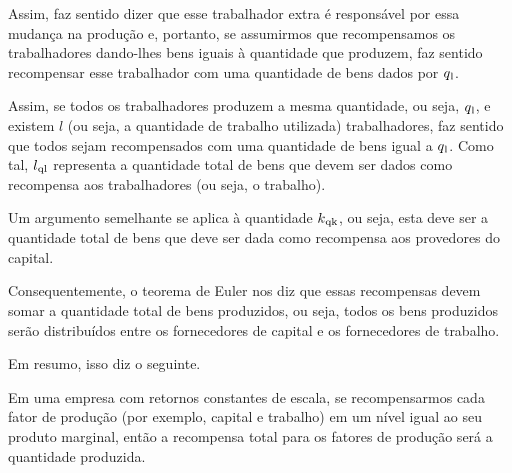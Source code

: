 \documentclass[a4paper]{article}
\begin{document}
\par Assim, faz sentido dizer que esse trabalhador extra é responsável por essa mudança na produção e, portanto, se assumirmos que recompensamos os trabalhadores dando-lhes bens iguais à quantidade que produzem, faz sentido recompensar esse trabalhador com uma quantidade de bens dados por $q\textsubscript{l}$.

\par Assim, se todos os trabalhadores produzem a mesma quantidade, ou seja, $q\textsubscript{l}$, e existem $l$ (ou seja, a quantidade de trabalho utilizada) trabalhadores, faz sentido que todos sejam recompensados com uma quantidade de bens igual a $q\textsubscript{l}$. Como tal, $l\textsubscript{ql}$ representa a quantidade total de bens que devem ser dados como recompensa aos trabalhadores (ou seja, o trabalho).

\par Um argumento semelhante se aplica à quantidade $k\textsubscript{qk}$, ou seja, esta deve ser a quantidade total de bens que deve ser dada como recompensa aos provedores do capital.

\par Consequentemente, o teorema de Euler nos diz que essas recompensas devem somar a quantidade total de bens produzidos, ou seja, todos os bens produzidos serão distribuídos entre os fornecedores de capital e os fornecedores de trabalho.

\par Em resumo, isso diz o seguinte.

\par Em uma empresa com retornos constantes de escala, se recompensarmos cada fator de produção (por exemplo, capital e trabalho) em um nível igual ao seu produto marginal, então a recompensa total para os fatores de produção será a quantidade produzida.
\end{document}
